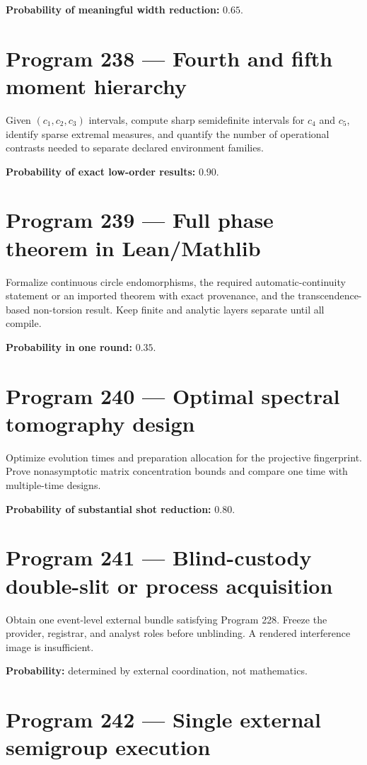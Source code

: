\documentclass[11pt,a4paper,openany]{report}
\begin{document}
\textbf{Probability of meaningful width reduction:} \(0.65\).

\section{Program 238 --- Fourth and fifth moment hierarchy}

Given \((c_1,c_2,c_3)\) intervals, compute sharp semidefinite intervals for \(c_4\) and \(c_5\), identify sparse extremal measures, and quantify the number of operational contrasts needed to separate declared environment families.

\textbf{Probability of exact low-order results:} \(0.90\).

\section{Program 239 --- Full phase theorem in Lean/\allowbreak{}Mathlib}

Formalize continuous circle endomorphisms, the required automatic-continuity statement or an imported theorem with exact provenance, and the transcendence-based non-torsion result. Keep finite and analytic layers separate until all compile.

\textbf{Probability in one round:} \(0.35\).

\section{Program 240 --- Optimal spectral tomography design}

Optimize evolution times and preparation allocation for the projective fingerprint. Prove nonasymptotic matrix concentration bounds and compare one time with multiple-time designs.

\textbf{Probability of substantial shot reduction:} \(0.80\).

\section{Program 241 --- Blind-custody double-slit or process acquisition}

Obtain one event-level external bundle satisfying Program 228. Freeze the provider, registrar, and analyst roles before unblinding. A rendered interference image is insufficient.

\textbf{Probability:} determined by external coordination, not mathematics.

\section{Program 242 --- Single external semigroup execution}
\end{document}
